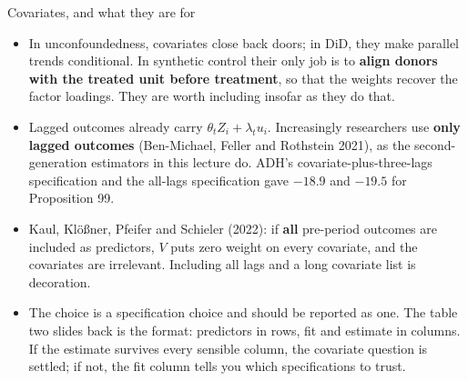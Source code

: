 \documentclass[
  11pt,
  ignorenonframetext,
  aspectratio=169,
]{beamer}
\providecommand{\tightlist}{%
  \setlength{\itemsep}{0pt}\setlength{\parskip}{0pt}}
\begin{document}
\begin{frame}{Covariates, and what they are for}
\protect{}\label{covariates-and-what-they-are-for}
\begin{itemize}
\tightlist
\item
  In unconfoundedness, covariates close back doors; in DiD, they make
  parallel trends conditional. In synthetic control their only job is to
  \textbf{align donors with the treated unit before treatment}, so that
  the weights recover the factor loadings. They are worth including
  insofar as they do that.
\item
  Lagged outcomes already carry \(\theta_t Z_i + \lambda_t u_i\).
  Increasingly researchers use \textbf{only lagged outcomes}
  (Ben-Michael, Feller and Rothstein 2021), as the second-generation
  estimators in this lecture do. ADH's covariate-plus-three-lags
  specification and the all-lags specification gave \(-18.9\) and
  \(-19.5\) for Proposition 99.
\item
  Kaul, Klößner, Pfeifer and Schieler (2022): if \textbf{all} pre-period
  outcomes are included as predictors, \(V\) puts zero weight on every
  covariate, and the covariates are irrelevant. Including all lags and a
  long covariate list is decoration.
\item
  The choice is a specification choice and should be reported as one.
  The table two slides back is the format: predictors in rows, fit and
  estimate in columns. If the estimate survives every sensible column,
  the covariate question is settled; if not, the fit column tells you
  which specifications to trust.
\end{itemize}
\end{frame}
\end{document}
